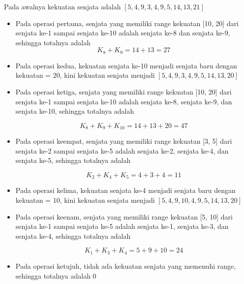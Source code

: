 \documentclass{article}
\begin{document}
Pada awalnya kekuatan senjata adalah $\left[5, 4, 9, 3, 4, 9, 5, 14, 13, 21\right]$

\begin{itemize}

\item Pada operasi pertama, senjata yang memiliki range kekuatan [10, 20] dari senjata ke-1 sampai senjata ke-10 adalah senjata ke-8 dan senjata ke-9, sehingga totalnya adalah $$K_8 + K_9 = 14 + 13 = 27$$
\item Pada operasi kedua, kekuatan senjata ke-10 menjadi senjata baru dengan kekuatan = 20, kini kekuatan senjata menjadi $\left[5, 4, 9, 3, 4, 9, 5, 14, 13, 20\right]$
\item Pada operasi ketiga, senjata yang memiliki range kekuatan [10, 20] dari senjata ke-1 sampai senjata ke-10 adalah senjata ke-8, senjata ke-9, dan senjata ke-10, sehingga totalnya adalah

$$K_8 + K_9 + K_{10} = 14 + 13 + 20 = 47$$

\item Pada operasi keempat, senjata yang memiliki range kekuatan [3, 5] dari senjata ke-2 sampai senjata ke-5 adalah senjata ke-2, senjata ke-4, dan senjata ke-5, sehingga totalnya adalah

$$K_2 + K_4 + K_5 = 4 + 3 + 4 = 11$$

\item Pada operasi kelima, kekuatan senjata ke-4 menjadi senjata baru dengan kekuatan = 10, kini kekuatan senjata menjadi $\left[5, 4, 9, 10, 4, 9, 5, 14, 13, 20\right]$
\item Pada operasi keenam, senjata yang memiliki range kekuatan [5, 10] dari senjata ke-1 sampai senjata ke-5 adalah senjata ke-1, senjata ke-3, dan senjata ke-4, sehingga totalnya adalah

$$K_1 + K_3 + K_4 = 5 + 9 + 10 = 24$$

\item Pada operasi ketujuh, tidak ada kekuatan senjata yang memenuhi range, sehingga totalnya adalah 0

\end{itemize}

\pagebreak
\end{document}
